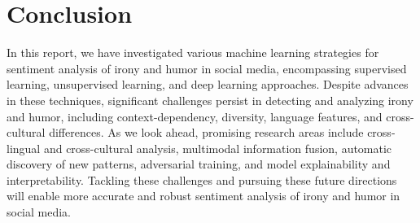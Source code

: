\documentclass[a4paper]{article}
\begin{document}
\section{Conclusion}
In this report, we have investigated various machine learning strategies for sentiment analysis of irony and humor in social media, encompassing supervised learning, unsupervised learning, and deep learning approaches. Despite advances in these techniques, significant challenges persist in detecting and analyzing irony and humor, including context-dependency, diversity, language features, and cross-cultural differences. As we look ahead, promising research areas include cross-lingual and cross-cultural analysis, multimodal information fusion, automatic discovery of new patterns, adversarial training, and model explainability and interpretability. Tackling these challenges and pursuing these future directions will enable more accurate and robust sentiment analysis of irony and humor in social media.
\end{document}
